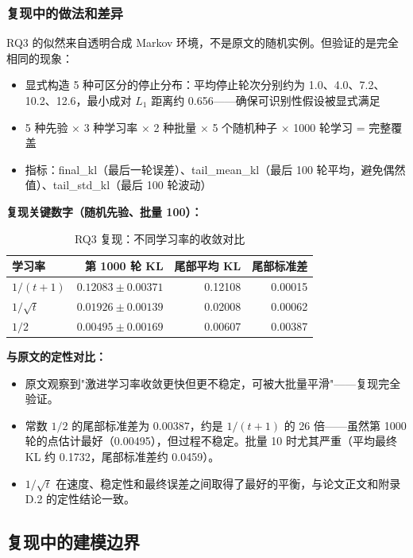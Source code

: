 \documentclass[12pt,a4paper]{article}
\theoremstyle{definition}
\begin{document}
\subsubsection{复现中的做法和差异}

RQ3 的似然来自透明合成 Markov 环境，不是原文的随机实例。但验证的是完全相同的现象：

\begin{itemize}[leftmargin=*]
    \item 显式构造 5 种可区分的停止分布：平均停止轮次分别约为 1.0、4.0、7.2、10.2、12.6，最小成对 $L_1$ 距离约 0.656——确保可识别性假设被显式满足
    \item 5 种先验 × 3 种学习率 × 2 种批量 × 5 个随机种子 × 1000 轮学习 = 完整覆盖
    \item 指标：final\_kl（最后一轮误差）、tail\_mean\_kl（最后 100 轮平均，避免偶然值）、tail\_std\_kl（最后 100 轮波动）
\end{itemize}

\textbf{复现关键数字（随机先验、批量 100）：}

\begin{table}[h]
\centering
\small
\caption{RQ3 复现：不同学习率的收敛对比}
\begin{tabular}{lrrr}
\toprule
学习率 & 第 1000 轮 KL & 尾部平均 KL & 尾部标准差 \\
\midrule
$1/(t+1)$ & $0.12083\pm0.00371$ & 0.12108 & 0.00015 \\
$1/\sqrt t$ & $0.01926\pm0.00139$ & 0.02008 & 0.00062 \\
$1/2$ & $0.00495\pm0.00169$ & 0.00607 & 0.00387 \\
\bottomrule
\end{tabular}
\end{table}

\textbf{与原文的定性对比：}
\begin{itemize}[leftmargin=*]
    \item 原文观察到"激进学习率收敛更快但更不稳定，可被大批量平滑"——复现完全验证。
    \item 常数 $1/2$ 的尾部标准差为 $0.00387$，约是 $1/(t+1)$ 的 26 倍——虽然第 1000 轮的点估计最好（0.00495），但过程不稳定。批量 10 时尤其严重（平均最终 KL 约 0.1732，尾部标准差约 0.0459）。
    \item $1/\sqrt t$ 在速度、稳定性和最终误差之间取得了最好的平衡，与论文正文和附录 D.2 的定性结论一致。
\end{itemize}

\subsection{复现中的建模边界}
\end{document}
